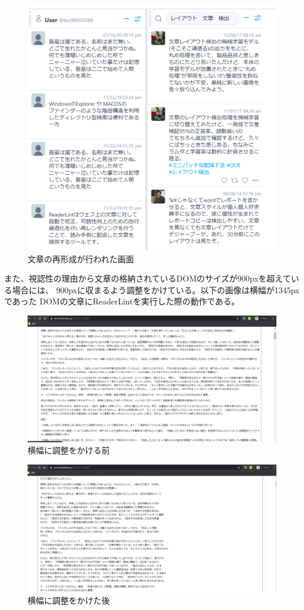 \begin{figure}[H]
    \centering
    \label{fig:image11}
    \includegraphics[width=0.6\columnwidth]{image/03/img2.png}
    \caption[文章の再形成が行われた画面]{文章の再形成が行われた画面}
\end{figure}

また、視認性の理由から文章の格納されているDOMのサイズが900pxを超えている場合には、
900pxに収まるよう調整をかけている。以下の画像は横幅が1345pxであった
DOMの文章にReaderLintを実行した際の動作である。\footnotemark[1]


\begin{figure}[H]
    \centering
    \label{fig:image12}
    \includegraphics[width=0.8\columnwidth]{image/03/img3.png}
    \caption[横幅に調整をかける前]{横幅に調整をかける前}
\end{figure}
\begin{figure}[H]
    \centering
    \label{fig:image13}
    \includegraphics[width=0.8\columnwidth]{image/03/img4.png}
    \caption[横幅に調整をかけた後]{横幅に調整をかけた後}
\end{figure}

